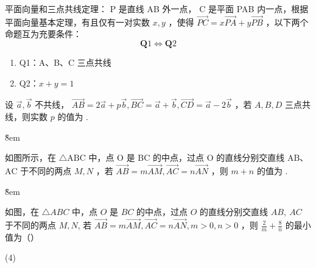 \begin{theorem}[三点共线定理]
    平面向量和三点共线定理： P 是直线 AB 外一点， C 是平面 PAB 内一点，根据平面向量基本定理，有且仅有一对实数 $x, y$ ，使得 $\overrightarrow{P C}=x \overrightarrow{P A}+y \overrightarrow{P B}$ ，以下两个命题互为充要条件：
    $$
        \boldsymbol{Q} 1 \Longleftrightarrow \boldsymbol{Q} 2
    $$
    \begin{enumerate}
        \item Q1：A、B、C 三点共线
        \item Q2：$x+y=1$
    \end{enumerate}
\end{theorem}

\begin{example}
    设 $\vec{a}, \vec{b}$ 不共线， $\overrightarrow{A B}=2 \vec{a}+p \vec{b}, \overrightarrow{B C}= \vec{a}+\vec{b}, \overrightarrow{C D}=\vec{a}-2 \vec{b}$ ，若 $A, B, D$ 三点共线，则实数 $p$ 的值为 \underline{\qquad}.
\end{example}

\v{8em}

\begin{example}
    如图所示，在 $\triangle \mathrm{ABC}$ 中，点 O 是 BC 的中点，过点 O 的直线分别交直线 $\mathrm{AB}$、$\mathrm{AC}$ 于不同的两点 $M, N$ ，若 $\overrightarrow{A B}=m \overrightarrow{A M}, \overrightarrow{A C}=n \overrightarrow{A N}$ ，则 $m+n$ 的值为 \underline{\qquad}.

\end{example}

\v{8em}

\begin{example}
    如图，在 $\triangle A B C$ 中，点 $O$ 是 $B C$ 的中点，过点 $O$ 的直线分别交直线 $A B, ~ A C$ 于不同的两点 $M, N$, 若 $\overrightarrow{A B}=m \overrightarrow{A M}, \overrightarrow{A C}=n \overrightarrow{A N}, m>0, n>0$ ，则 $\frac{2}{m}+\frac{8}{n}$ 的最小值为（\quad）
    \begin{tasks}(4)
    \end{tasks}
\end{example}

